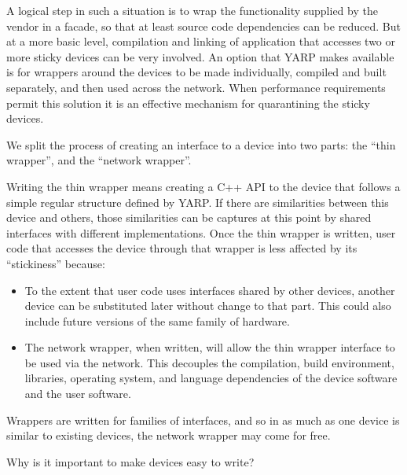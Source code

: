 A logical step in such a situation is to wrap the functionality
supplied by the vendor in a facade, so that at least source code
dependencies can be reduced.  But at a more basic level,
compilation and linking of application that accesses two or more
sticky devices can be very involved.  An option that YARP makes
available is for wrappers around the devices to be made individually,
compiled and built separately, and then used across the network.
When performance requirements permit this solution it is an
effective mechanism for quarantining the sticky devices.

We split the process of creating an interface to a device into two
parts: the ``thin wrapper'', and the ``network wrapper''.  

Writing the thin wrapper means creating a C++ API to the device
that follows a simple regular structure defined by YARP.
If there are similarities between this device and others,
those similarities can be captures at this point by 
shared interfaces with different implementations.
Once the thin wrapper is written, user code that accesses
the device through that wrapper is less affected by its ``stickiness''
because:

\begin{itemize}

\item To the extent that user code uses interfaces shared by other
devices, another device can be substituted later without change to
that part.  This could also include future versions of the same family
of hardware.

\item The network wrapper, when written, will allow the thin wrapper
interface to be used via the network.  This decouples the compilation,
build environment, libraries, operating system, and language
dependencies of the device software and the user software.

\end{itemize}

Wrappers are written for families of interfaces, and so in as much
as one device is similar to existing devices, the network 
wrapper may come for free.

Why is it important to make devices easy to write?

